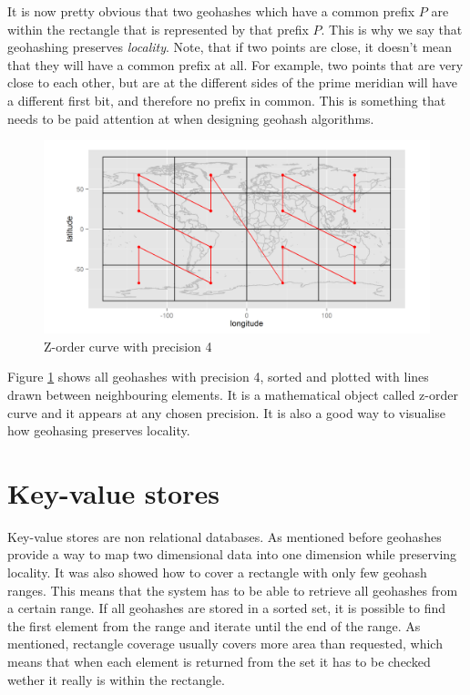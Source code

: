 \documentclass[times, utf8, diplomski]{fer}
\begin{document}
It is now pretty obvious that two geohashes which have a common prefix $P$ are within the rectangle that is represented by that prefix $P$. This is why we say that geohashing preserves \emph{locality}. Note, that if two points are close, it doesn't mean that they will have a common prefix at all. For example, two points that are very close to each other, but are at the different sides of the prime meridian will have a different first bit, and therefore no prefix in common. This is something that needs to be paid attention at when designing geohash algorithms.

\begin{figure}[h]
\includegraphics[width=\textwidth]{z_curve}
\caption{Z-order curve with precision 4 \cite {spatiotemporal}}
\label{fig:zcurve}
\end{figure}

Figure \ref{fig:zcurve} shows all geohashes with precision 4, sorted and plotted with lines drawn between neighbouring elements. It is a mathematical object called z-order curve \cite{zcurve} and it appears at any chosen precision. It is also a good way to visualise how geohasing preserves locality.

\section{Key-value stores}
Key-value stores are non relational databases.
As mentioned before geohashes provide a way to map two dimensional data into one dimension while preserving locality. It was also showed how to cover a rectangle with only few geohash ranges. This means that the system has to be able to retrieve all geohashes from a certain range. If all geohashes are stored in a sorted set, it is possible to find the first element from the range and iterate until the end of the range. As mentioned, rectangle coverage usually covers more area than requested, which means that when each element is returned from the set it has to be checked wether it really is within the rectangle.
\end{document}
